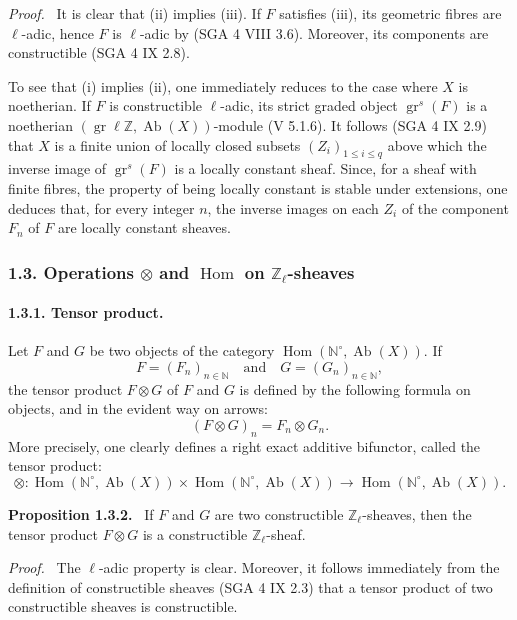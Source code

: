 \documentclass[11pt]{article}
\newenvironment{statement}[1]{\par\medskip\noindent\textbf{#1.}\ }{\par\medskip}
\newenvironment{prooftext}[1][Proof]{\par\noindent\emph{#1.}\ }{\par\medskip}
\DeclareMathOperator{\Hom}{Hom}
\providecommand{\Hom}{\operatorname{Hom}}
\providecommand{\Ab}{\operatorname{Ab}}
\providecommand{\Ab}{\operatorname{Ab}}
\begin{document}
\begin{prooftext}[Proof]
It is clear that (ii) implies (iii). If \(F\) satisfies (iii), its geometric fibres are \(\ell\)-adic, hence \(F\) is \(\ell\)-adic by (SGA 4 VIII 3.6). Moreover, its components are constructible (SGA 4 IX 2.8).

To see that (i) implies (ii), one immediately reduces to the case where \(X\) is noetherian. If \(F\) is constructible \(\ell\)-adic, its strict graded object \(\operatorname{gr}^s(F)\) is a noetherian \((\operatorname{gr}\ell\mathbb Z,\Ab(X))\)-module (V 5.1.6). It follows (SGA 4 IX 2.9) that \(X\) is a finite union of locally closed subsets \((Z_i)_{1\le i\le q}\) above which the inverse image of \(\operatorname{gr}^s(F)\) is a locally constant sheaf. Since, for a sheaf with finite fibres, the property of being locally constant is stable under extensions, one deduces that, for every integer \(n\), the inverse images on each \(Z_i\) of the component \(F_n\) of \(F\) are locally constant sheaves.
\end{prooftext}

\subsubsection*{1.3. Operations \(\otimes\) and \(\Hom\) on \(\mathbb Z_\ell\)-sheaves}

\paragraph{1.3.1. Tensor product.}
Let \(F\) and \(G\) be two objects of the category \(\Hom(\mathbb N^\circ,\Ab(X))\). If
\[
F=(F_n)_{n\in\mathbb N}\quad\text{and}\quad G=(G_n)_{n\in\mathbb N},
\]
the tensor product \(F\otimes G\) of \(F\) and \(G\) is defined by the following formula on objects, and in the evident way on arrows:
\[
(F\otimes G)_n=F_n\otimes G_n.
\]
More precisely, one clearly defines a right exact additive bifunctor, called the tensor product:
\[
\otimes:\Hom(\mathbb N^\circ,\Ab(X))\times \Hom(\mathbb N^\circ,\Ab(X))
\longrightarrow \Hom(\mathbb N^\circ,\Ab(X)).
\]

\begin{statement}{Proposition 1.3.2}
If \(F\) and \(G\) are two constructible \(\mathbb Z_\ell\)-sheaves, then the tensor product \(F\otimes G\) is a constructible \(\mathbb Z_\ell\)-sheaf.
\end{statement}

\begin{prooftext}[Proof]
The \(\ell\)-adic property is clear. Moreover, it follows immediately from the definition of constructible sheaves (SGA 4 IX 2.3) that a tensor product of two constructible sheaves is constructible.
\end{prooftext}
\end{document}
